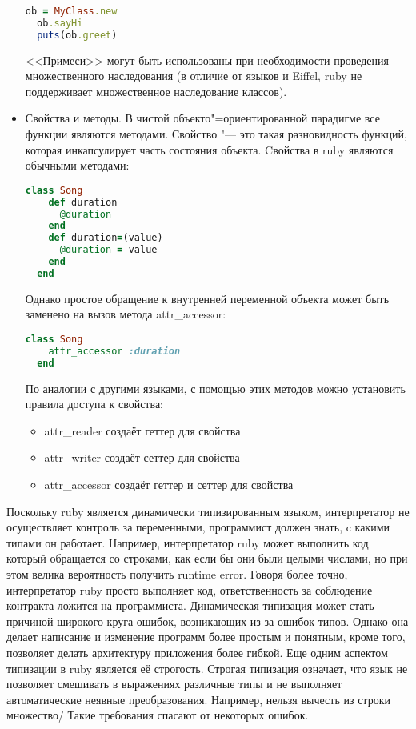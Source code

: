 \begin{itemize}
\begin{lstlisting}[language=Ruby, style=rubystyle]
  ob = MyClass.new
  ob.sayHi
  puts(ob.greet)
        \end{lstlisting}
        <<Примеси>> могут быть использованы при необходимости проведения множественного наследования (в отличие от языков \cpp{} и Eiffel, ruby не поддерживает множественное наследование классов).
  \item Свойства и методы.
        В чистой объекто"=ориентированной парадигме все функции являются методами.
        Свойство "--- это такая разновидность функций, которая инкапсулирует часть состояния объекта.
        Cвойства в ruby являются обычными методами:
        \begin{lstlisting}[language=Ruby, style=rubystyle]
  class Song
    def duration
      @duration
    end
    def duration=(value)
      @duration = value
    end
  end
         \end{lstlisting}
         Однако простое обращение к внутренней переменной объекта может быть заменено на вызов метода attr\_accessor:
         \begin{lstlisting}[language=Ruby, style=rubystyle]
  class Song
    attr_accessor :duration
  end
         \end{lstlisting}
        По аналогии с другими языками, с помощью этих методов можно установить правила доступа к свойства:\cite{trpr_2011_ru}
        \begin{itemize}
        \item attr\_reader создаёт геттер для свойства
        \item attr\_writer создаёт сеттер для свойства
        \item attr\_accessor создаёт геттер и сеттер для свойства
        \end{itemize}
\end{itemize}

Поскольку ruby является динамически типизированным языком, интерпретатор не осуществляет контроль за переменными, программист должен знать, c какими типами он работает.
Например, интерпретатор ruby может выполнить код который обращается со строками, как если бы они были целыми числами, но при этом велика вероятность получить runtime error.
Говоря более точно, интерпретатор ruby просто выполняет код, ответственность за соблюдение контракта ложится на программиста.
Динамическая типизация может стать причиной широкого круга ошибок, возникающих из-за ошибок типов.
Однако она делает написание и изменение программ более простым и понятным, кроме того, позволяет делать архитектуру приложения более гибкой.
Еще одним аспектом типизации в ruby является её строгость.
Строгая типизация означает, что язык не позволяет смешивать в выражениях различные типы и не выполняет автоматические неявные преобразования.
Например, нельзя вычесть из строки множество/
Такие требования спасают от некоторых ошибок.

